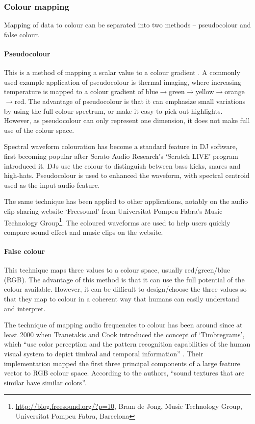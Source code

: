 \subsubsection{Colour mapping}\label{sec:litreviewcolour}
Mapping of data to colour can be separated into two methods -- pseudocolour and
false colour.

\paragraph{Pseudocolour}
This is a method of mapping a scalar value to a colour gradient
\cite{Moreland2009}. A commonly used example application of pseudocolour is
thermal imaging, where increasing temperature is mapped to a colour gradient of
blue$\to$green$\to$yellow$\to$orange$\to$red. The advantage of pseudocolour is
that it can emphasize small variations by using the full colour spectrum, or
make it easy to pick out highlights. However, as pseudocolour can only
represent one dimension, it does not make full use of the colour space.

Spectral waveform colouration has become a standard feature in DJ software,
first becoming popular after Serato Audio Research's `Scratch LIVE' program
introduced it.  DJs use the colour to distinguish between bass kicks, snares
and high-hats. Pseudocolour is used to enhanced the waveform, with spectral
centroid used as the input audio feature.

The same technique has been applied to other applications, notably on the audio
clip sharing website `Freesound' from Universitat Pompeu Fabra's Music
Technology Group\footnote{\url{http://blog.freesound.org/?p=10}, Bram de Jong,
  Music Technology Group, Universitat Pompeu Fabra, Barcelona}. The coloured
waveforms are used to help users quickly compare sound effect and music clips
on the website.

\paragraph{False colour}
This technique maps three values to a colour space, usually red/green/blue
(RGB). The advantage of this method is that it can use the full potential of
the colour available. However, it can be difficult to design/choose the three
values so that they map to colour in a coherent way that humans can easily
understand and interpret.

The technique of mapping audio frequencies to colour has been around since at
least 2000 when Tzanetakis and Cook introduced the concept of `Timbregrams',
which ``use color perception and the pattern recognition capabilities of the
human visual system to depict timbral and temporal information''
\cite{Tzanetakis2000}. Their implementation mapped the first three principal
components of a large feature vector to RGB colour space. According to the
authors, ``sound textures that are similar have similar colors''.

